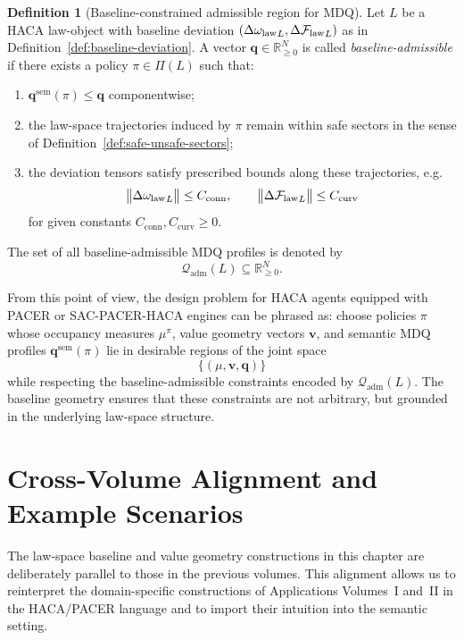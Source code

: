 \documentclass[11pt]{book}
\theoremstyle{plain}
\theoremstyle{definition}
\newtheorem{definition}[theorem]{Definition}
\theoremstyle{remark}
\begin{document}
\begin{definition}[Baseline-constrained admissible region for MDQ]
\label{def:baseline-constrained-mdq-region}
Let $L$ be a HACA law-object with baseline deviation
$(\Delta{\ensuremath{\omega_{\mathrm{law}}}}_L,\Delta{\ensuremath{\mathcal{F}_{\mathrm{law}}}}_L)$ as in
Definition~\ref{def:baseline-deviation}. A vector
$\mathbf{q}\in\mathbb{R}_{\ge 0}^N$ is called \emph{baseline-admissible}
if there exists a policy $\pi\in\Pi(L)$ such that:
\begin{enumerate}
  \item $\mathbf{q}^{\mathrm{sem}}(\pi)\le\mathbf{q}$ componentwise;
  \item the law-space trajectories induced by $\pi$ remain within safe
        sectors in the sense of
        Definition~\ref{def:safe-unsafe-sectors};
  \item the deviation tensors satisfy prescribed bounds along these
        trajectories, e.g.
        \[
          \bigl\|\Delta{\ensuremath{\omega_{\mathrm{law}}}}_L\bigr\|\le C_{\mathrm{conn}},
          \qquad
          \bigl\|\Delta{\ensuremath{\mathcal{F}_{\mathrm{law}}}}_L\bigr\|\le C_{\mathrm{curv}}
        \]
        for given constants
        $C_{\mathrm{conn}},C_{\mathrm{curv}}\ge 0$.
\end{enumerate}
The set of all baseline-admissible MDQ profiles is denoted by
\[
  \mathcal{Q}_{\mathrm{adm}}(L)
  \subseteq \mathbb{R}_{\ge 0}^N.
\]
\end{definition}

From this point of view, the design problem for HACA agents equipped
with PACER or SAC-PACER-HACA engines can be phrased as: choose policies
$\pi$ whose occupancy measures $\mu^\pi$, value geometry vectors
$\mathbf{v}$, and semantic MDQ profiles
$\mathbf{q}^{\mathrm{sem}}(\pi)$ lie in desirable regions of the joint
space
\[
  \bigl\{(\mu,\mathbf{v},\mathbf{q})\bigr\}
\]
while respecting the baseline-admissible constraints encoded by
$\mathcal{Q}_{\mathrm{adm}}(L)$. The baseline geometry ensures that
these constraints are not arbitrary, but grounded in the underlying
law-space structure.

\section[Cross-Volume Alignment and Example Scenarios]{Cross-Volume Alignment and Example Scenarios}
The law-space baseline and value geometry constructions in this chapter
are deliberately parallel to those in the previous volumes. This
alignment allows us to reinterpret the domain-specific constructions of
Applications Volumes~I and~II in the HACA/PACER language and to import
their intuition into the semantic setting.
\end{document}
